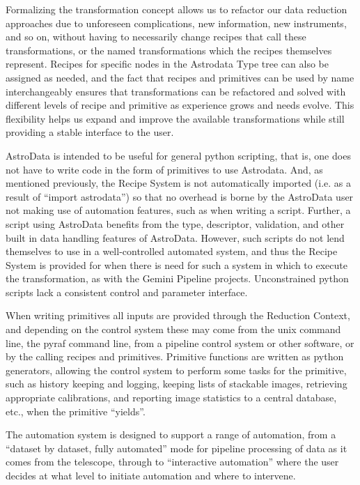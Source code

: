 \documentclass[letterpaper,10pt,english]{sphinxmanual}
\begin{document}
Formalizing the transformation concept allows us to refactor our data
reduction approaches due to unforeseen complications, new information,
new instruments, and so on, without having to necessarily change
recipes that call these transformations, or the named transformations
which the recipes themselves represent. Recipes for specific nodes in
the Astrodata Type tree can also be assigned as needed, and the fact
that recipes and primitives can be used by name interchangeably
ensures that transformations can be refactored and solved with
different levels of recipe and primitive as experience grows and needs
evolve. This flexibility helps us expand and improve the available
transformations while still providing a stable interface to the user.

AstroData is intended to be useful for general python scripting, that
is, one does not have to write code in the form of primitives to use
Astrodata. And, as mentioned previously, the Recipe System is not
automatically imported (i.e. as a result of ``import astrodata'') so
that no overhead is borne by the AstroData user not making use of
automation features, such as when writing a script. Further, a script
using AstroData benefits from the type, descriptor, validation, and
other built in data handling features of AstroData. However, such
scripts do not lend themselves to use in a well-controlled automated
system, and thus the Recipe System is provided for when there is need
for such a system in which to execute the transformation, as with the
Gemini Pipeline projects. Unconstrained python scripts lack a
consistent control and parameter interface.

When writing primitives all inputs are provided through the Reduction
Context, and depending on the control system these may come from the
unix command line, the pyraf command line, from a pipeline control
system or other software, or by the calling recipes and primitives.
Primitive functions are written as python generators, allowing the
control system to perform some tasks for the primitive, such as
history keeping and logging, keeping lists of stackable images,
retrieving appropriate calibrations, and reporting image statistics to
a central database, etc., when the primitive ``yields''.

The automation system is designed to support a range of automation,
from a ``dataset by dataset, fully automated'' mode for pipeline
processing of data as it comes from the telescope, through to
``interactive automation'' where the user decides at what level to
initiate automation and where to intervene.
\end{document}
